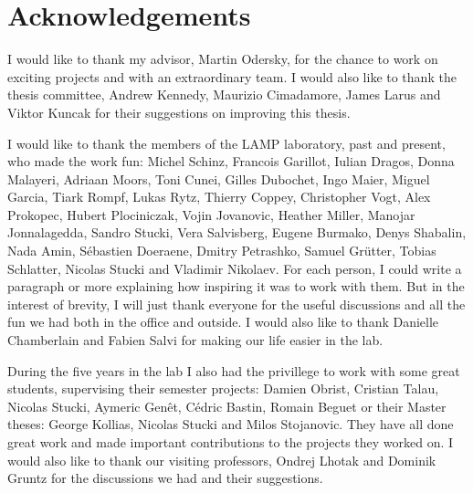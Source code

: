\chapter*{Acknowledgements}

\vspace{0.5em}

I would like to thank my advisor, Martin Odersky, for the chance to work on exciting projects and with an extraordinary team. I would also like to thank the thesis committee, Andrew Kennedy, Maurizio Cimadamore, James Larus and Viktor Kuncak for their suggestions on improving this thesis.

\vspace{0.5em}

I would like to thank the members of the LAMP laboratory, past and present, who made the work fun: Michel Schinz, Francois Garillot, Iulian Dragos, Donna Malayeri, Adriaan Moors, Toni Cunei, Gilles Dubochet, Ingo Maier, Miguel Garcia, Tiark Rompf, Lukas Rytz, Thierry Coppey, Christopher Vogt, Alex Prokopec, Hubert Plociniczak, Vojin Jovanovic, Heather Miller, Manojar Jonnalagedda, Sandro Stucki, Vera Salvisberg, Eugene Burmako, Denys Shabalin, Nada Amin, Sébastien Doeraene, Dmitry Petrashko, Samuel Grütter, Tobias Schlatter, Nicolas Stucki and Vladimir Nikolaev. For each person, I could write a paragraph or more explaining how inspiring it was to work with them. But in the interest of brevity, I will just thank everyone for the useful discussions and all the fun we had both in the office and outside. I would also like to thank Danielle Chamberlain and Fabien Salvi for making our life easier in the lab.

\vspace{0.5em}

During the five years in the lab I also had the privillege to work with some great students, supervising their semester projects: Damien Obrist, Cristian Talau, Nicolas Stucki, Aymeric Genêt, Cédric Bastin, Romain Beguet or their Master theses: George Kollias, Nicolas Stucki and Milos Stojanovic. They have all done great work and made important contributions to the projects they worked on. I would also like to thank our visiting professors, Ondrej Lhotak and Dominik Gruntz for the discussions we had and their suggestions.

\vspace{0.5em}

